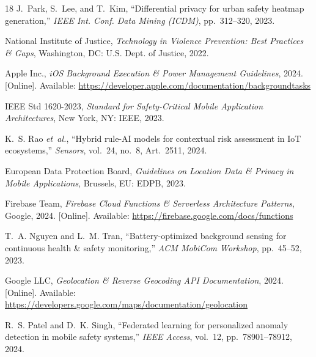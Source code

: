 \documentclass[conference,twocolumn]{IEEEtran}
\begin{document}
\begin{thebibliography}{18}
J.~Park, S.~Lee, and T.~Kim, ``Differential privacy for urban safety heatmap generation,'' \emph{IEEE Int. Conf. Data Mining (ICDM)}, pp.~312--320, 2023.

National Institute of Justice, \emph{Technology in Violence Prevention: Best Practices \& Gaps}, Washington, DC: U.S. Dept. of Justice, 2022.

Apple Inc., \emph{iOS Background Execution \& Power Management Guidelines}, 2024. [Online]. Available: \url{https://developer.apple.com/documentation/backgroundtasks}

IEEE Std 1620-2023, \emph{Standard for Safety-Critical Mobile Application Architectures}, New York, NY: IEEE, 2023.

K.~S. Rao \emph{et~al.}, ``Hybrid rule-AI models for contextual risk assessment in IoT ecosystems,'' \emph{Sensors}, vol.~24, no.~8, Art.~2511, 2024.

European Data Protection Board, \emph{Guidelines on Location Data \& Privacy in Mobile Applications}, Brussels, EU: EDPB, 2023.

Firebase Team, \emph{Firebase Cloud Functions \& Serverless Architecture Patterns}, Google, 2024. [Online]. Available: \url{https://firebase.google.com/docs/functions}

T.~A. Nguyen and L.~M. Tran, ``Battery-optimized background sensing for continuous health \& safety monitoring,'' \emph{ACM MobiCom Workshop}, pp.~45--52, 2023.

Google LLC, \emph{Geolocation \& Reverse Geocoding API Documentation}, 2024. [Online]. Available: \url{https://developers.google.com/maps/documentation/geolocation}

R.~S. Patel and D.~K. Singh, ``Federated learning for personalized anomaly detection in mobile safety systems,'' \emph{IEEE Access}, vol.~12, pp.~78901--78912, 2024.

\end{thebibliography}
\end{document}
